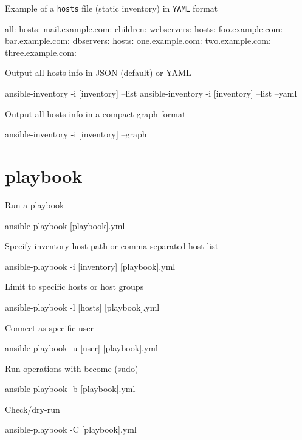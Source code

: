 \documentclass{refcard}
\begin{document}
Example of a \verb|hosts| file (static inventory) in \verb|YAML| format
\begin{yamlbox}
all:
  hosts:
    mail.example.com:
  children:
    webservers:
      hosts:
        foo.example.com:
        bar.example.com:
    dbservers:
      hosts:
        one.example.com:
        two.example.com:
        three.example.com:
\end{yamlbox}


Output all hosts info in JSON (default) or YAML
\begin{ttyenv}
ansible-inventory -i [inventory] --list
ansible-inventory -i [inventory] --list --yaml
\end{ttyenv}

Output all hosts info in a compact graph format
\begin{ttyenv}
ansible-inventory -i [inventory] --graph
\end{ttyenv}

\section{playbook}

Run a playbook
\begin{ttyenv}
ansible-playbook [playbook].yml
\end{ttyenv}

Specify inventory host path or comma separated host list
\begin{ttyenv}
ansible-playbook -i [inventory] [playbook].yml 
\end{ttyenv}

Limit to specific hosts or host groups
\begin{ttyenv}
ansible-playbook -l [hosts] [playbook].yml 
\end{ttyenv}

Connect as specific user
\begin{ttyenv}
ansible-playbook -u [user] [playbook].yml 
\end{ttyenv}

Run operations with become (sudo)
\begin{ttyenv}
ansible-playbook -b [playbook].yml 
\end{ttyenv}

Check/dry-run
\begin{ttyenv}
ansible-playbook -C [playbook].yml 
\end{ttyenv}
\end{document}

